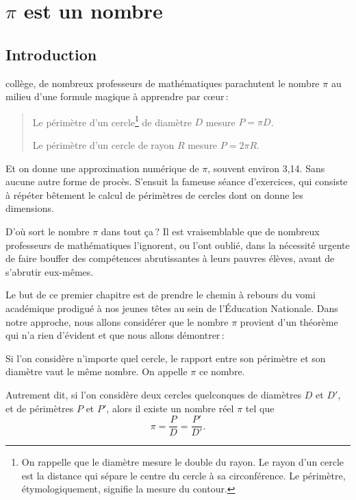 
\chapter{$\pi$ est un nombre}\label{chap_pinombre}

\section{Introduction}

	 collège, de nombreux professeurs de mathématiques parachutent le nombre $\pi$ au milieu d'une formule magique à apprendre par c\oe{}ur\,:
	\begin{quote}
		Le périmètre d'un cercle\footnote{On rappelle que le diamètre mesure le double du rayon. Le rayon d'un cercle est la distance qui sépare le centre du cercle à sa circonférence. Le périmètre, étymologiquement, signifie la mesure du contour.} de diamètre $D$ mesure $P=\pi D$.

		Le périmètre d'un cercle de rayon $R$ mesure $P=2\pi R$.
	\end{quote}

	Et on donne une approximation numérique de $\pi$, souvent environ 3,14. Sans aucune autre forme de procès. S'ensuit la fameuse séance d'exercices, qui consiste à répéter bêtement le calcul de périmètres de cercles dont on donne les dimensions.

	D'où sort le nombre $\pi$ dans tout ça\,? Il est vraisemblable que de nombreux professeurs de mathématiques l'ignorent, ou l'ont oublié, dans la nécessité urgente de faire bouffer des compétences abrutissantes à leurs pauvres élèves, avant de s'abrutir eux-mêmes.

	Le but de ce premier chapitre est de prendre le chemin à rebours du vomi académique prodigué à nos jeunes têtes au sein de l'Éducation Nationale. Dans notre approche, nous allons considérer que le nombre $\pi$ provient d'un théorème qui n'a rien d'évident et que nous allons démontrer\,:
	\begin{thm}
		Si l'on considère n'importe quel cercle, le rapport entre son périmètre et son diamètre vaut le même nombre. On appelle $\pi$ ce nombre.

		Autrement dit, si l'on considère deux cercles quelconques de diamètres $D$ et $D'$, et de périmètres $P$ et $P'$, alors il existe un nombre réel $\pi$ tel que
		\begin{equation}
			\pi=\frac{P}{D}=\frac{P'}{D'}. \nonumber
		\end{equation}
	\end{thm}
		
